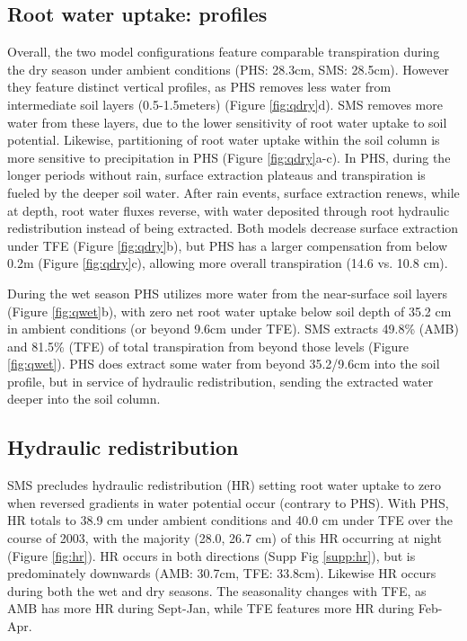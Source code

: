 \documentclass[draft,linenumbers]{agujournal}
\begin{document}
\subsection{Root water uptake: profiles}
    Overall, the two model configurations feature comparable transpiration during the dry season under ambient conditions (PHS: 28.3cm, SMS: 28.5cm).
    However they feature distinct vertical profiles, as PHS removes less water from intermediate soil layers (0.5-1.5meters) (Figure \ref{fig:qdry}d).
    SMS removes more water from these layers, due to the lower sensitivity of root water uptake to soil potential.
    Likewise, partitioning of root water uptake within the soil column is more sensitive to precipitation in PHS (Figure \ref{fig:qdry}a-c). In PHS, during the longer periods without rain, surface extraction plateaus and transpiration is fueled by the deeper soil water.
    After rain events, surface extraction renews, while at depth, root water fluxes reverse, with water deposited through root hydraulic redistribution instead of being extracted.
    Both models decrease surface extraction under TFE (Figure \ref{fig:qdry}b), but PHS has a larger compensation from below 0.2m (Figure \ref{fig:qdry}c),
    allowing more overall transpiration (14.6 vs. 10.8 cm).
    
    During the wet season PHS utilizes more water from the near-surface soil layers (Figure \ref{fig:qwet}b), 
    with zero net root water uptake below soil depth of 35.2 cm in ambient conditions (or beyond 9.6cm under TFE).
    SMS extracts 49.8\% (AMB) and 81.5\% (TFE) of total transpiration from beyond those levels (Figure \ref{fig:qwet}). 
    PHS does extract some water from beyond 35.2/9.6cm into the soil profile, but in service of hydraulic redistribution, 
    sending the extracted water deeper into the soil column.
        
\subsection{Hydraulic redistribution}
    SMS precludes hydraulic redistribution (HR) setting root water uptake to zero when reversed gradients in water potential occur (contrary to PHS).
    With PHS, HR totals to 38.9 cm under ambient conditions and 40.0 cm under TFE over the course of 2003, with the majority (28.0, 26.7 cm) of this HR occurring at night (Figure \ref{fig:hr}).
    HR occurs in both directions (Supp Fig \ref{supp:hr}), but is predominately downwards (AMB: 30.7cm, TFE: 33.8cm).
    Likewise HR occurs during both the wet and dry seasons.
    The seasonality changes with TFE, as AMB has more HR during Sept-Jan, while TFE features more HR during Feb-Apr.
\end{document}
